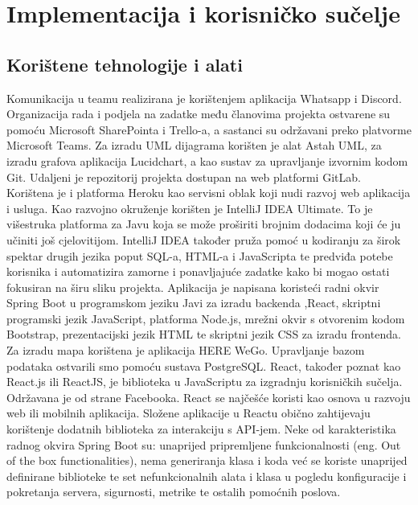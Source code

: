 \chapter{Implementacija i korisničko sučelje}
		
		
		\section{Korištene tehnologije i alati}
		
			
			
			
		
	        Komunikacija u teamu realizirana je korištenjem aplikacija Whatsapp i Discord. Organizacija rada i podjela na zadatke među članovima projekta ostvarene su pomoću  Microsoft SharePointa i Trello-a, a sastanci su održavani preko platvorme Microsoft Teams. Za izradu UML dijagrama korišten je alat Astah UML, za izradu grafova aplikacija Lucidchart, a kao sustav za upravljanje izvornim kodom Git. Udaljeni je repozitorij projekta dostupan na web platformi GitLab. Korištena je i platforma Heroku kao servisni oblak koji nudi razvoj web aplikacija i usluga. 
Kao razvojno okruženje korišten je IntelliJ IDEA Ultimate. To je višestruka platforma za Javu koja se može proširiti brojnim dodacima koji će ju učiniti još cjelovitijom. IntelliJ IDEA također pruža pomoć u kodiranju za širok spektar drugih jezika poput SQL-a, HTML-a i JavaScripta te predviđa potebe korisnika i automatizira zamorne i ponavljajuće zadatke kako bi mogao ostati fokusiran na širu sliku projekta.
Aplikacija je napisana koristeći radni okvir Spring Boot  u programskom jeziku Javi za izradu backenda ,React, skriptni programski jezik JavaScript, platforma Node.js, mrežni okvir s otvorenim kodom Bootstrap, prezentacijski jezik HTML te skriptni jezik CSS za izradu frontenda. Za izradu mapa korištena je aplikacija HERE WeGo. Upravljanje bazom podataka ostvarili smo pomoću sustava PostgreSQL. 
React, također poznat kao React.js ili ReactJS, je biblioteka u JavaScriptu za izgradnju korisničkih sučelja. Održavana je od strane Facebooka. React se najčešće koristi kao osnova u razvoju web ili mobilnih aplikacija. Složene aplikacije u Reactu obično zahtijevaju korištenje dodatnih biblioteka za interakciju s API-jem. Neke od karakteristika radnog okvira Spring Boot su: unaprijed pripremljene funkcionalnosti (eng. Out of the box functionalities), nema generiranja klasa i koda već se koriste unaprijed definirane biblioteke te set nefunkcionalnih alata i klasa u pogledu konfiguracije i pokretanja servera, sigurnosti, metrike te ostalih pomoćnih poslova.
\eject
